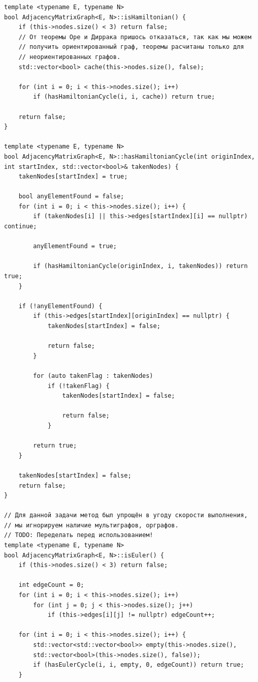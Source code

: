 \documentclass[a4paper,14pt]{extarticle}
\begin{document}
\begin{enumerate}[1.]
\begin{verbatim}
template <typename E, typename N>
bool AdjacencyMatrixGraph<E, N>::isHamiltonian() {
    if (this->nodes.size() < 3) return false;
    // От теоремы Оре и Диррака пришось отказаться, так как мы можем 
    // получить ориентированный граф, теоремы расчитаны только для 
    // неориентированных графов.
    std::vector<bool> cache(this->nodes.size(), false);

    for (int i = 0; i < this->nodes.size(); i++)
        if (hasHamiltonianCycle(i, i, cache)) return true;

    return false;
}

template <typename E, typename N>
bool AdjacencyMatrixGraph<E, N>::hasHamiltonianCycle(int originIndex, int startIndex, std::vector<bool>& takenNodes) {
    takenNodes[startIndex] = true;

    bool anyElementFound = false;
    for (int i = 0; i < this->nodes.size(); i++) {
        if (takenNodes[i] || this->edges[startIndex][i] == nullptr) continue;

        anyElementFound = true;
        
        if (hasHamiltonianCycle(originIndex, i, takenNodes)) return true;
    }

    if (!anyElementFound) {
        if (this->edges[startIndex][originIndex] == nullptr) {
            takenNodes[startIndex] = false;

            return false;
        }

        for (auto takenFlag : takenNodes) 
            if (!takenFlag) {
                takenNodes[startIndex] = false;

                return false;
            }

        return true;
    }

    takenNodes[startIndex] = false;
    return false;
}

// Для данной задачи метод был упрощён в угоду скорости выполнения, 
// мы игнорируем наличие мультиграфов, орграфов.
// TODO: Переделать перед использованием!
template <typename E, typename N>
bool AdjacencyMatrixGraph<E, N>::isEuler() {
    if (this->nodes.size() < 3) return false;

    int edgeCount = 0;
    for (int i = 0; i < this->nodes.size(); i++) 
        for (int j = 0; j < this->nodes.size(); j++) 
            if (this->edges[i][j] != nullptr) edgeCount++;

    for (int i = 0; i < this->nodes.size(); i++) {
        std::vector<std::vector<bool>> empty(this->nodes.size(), 
        std::vector<bool>(this->nodes.size(), false));
        if (hasEulerCycle(i, i, empty, 0, edgeCount)) return true;
    }


\end{verbatim}
\end{enumerate}
\end{document}
